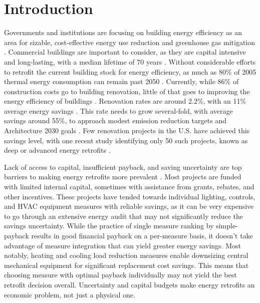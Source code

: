 \documentclass[review]{elsarticle}
\begin{document}
\section{Introduction}
Governments and institutions are focusing on building energy efficiency as an area for sizable, cost-effective energy use reduction and greenhouse gas mitigation \cite{McKinsey2009, Farese2012}.  Commercial buildings are important to consider, as they are capital intensive and long-lasting, with a median lifetime of 70 years \cite{BEDB3.2.7}. Without considerable efforts to retrofit the current building stock for energy efficiency, as much as 80\% of 2005 thermal energy consumption can remain past 2050 \cite{Urge-Vorsatz2013141}. Currently, while 86\% of construction costs go to building renovation, little of that goes to improving the energy efficiency of buildings \cite{Wang2012}. Renovation rates are around 2.2\%, with an 11\% average energy savings \cite{Olgyay2010244}. This rate needs to grow several-fold, with average savings around 55\%, to approach modest emission reduction targets and Architecture 2030 goals  \cite{Olgyay2010244}. Few renovation projects in the U.S. have achieved this savings level, with one recent study identifying only 50 such projects, known as deep or advanced energy retrofits \cite{NBI2011, AERG2011}.\par  
Lack of access to capital, insufficient payback, and saving uncertainty are top barriers to making energy retrofits more prevalent \cite{EEI2014, Abadie2012551}.  Most projects are funded with limited internal capital, sometimes with assistance from grants, rebates, and other incentives.  These projects have tended towards individual lighting, controls, and HVAC equipment measures with reliable savings, as it can be very expensive to go through an extensive energy audit that may not significantly reduce the savings uncertainty. While the practice of single measure ranking by simple-payback results in good financial payback on a per-measure basis, it doesn't take advantage of measure integration that can yield greater energy savings. Most notably, heating and cooling load reduction measures enable downsizing central mechanical equipment for significant replacement cost savings.  This means that choosing measure with optimal payback individually may not yield the best retrofit decision overall.  Uncertainty and capital budgets make energy retrofits an economic problem, not just a physical one.\par
\end{document}
